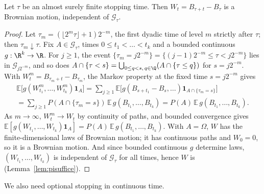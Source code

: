 \begin{theorem}\label{thm:strongmarkov}
Let $\tau$ be an almost surely finite stopping time. Then $W_t=B_{\tau+t}-B_\tau$ is a Brownian motion, independent of $\mathcal G_\tau$.
\end{theorem}
\begin{proof}
Let $\tau_m=(\lfloor2^m\tau\rfloor+1)2^{-m}$, the first dyadic time of level $m$ strictly after $\tau$; then $\tau_m\downarrow\tau$. Fix $A\in\mathcal G_\tau$, times
$0\le t_1<\dots<t_k$ and a bounded continuous $g:\R^k\to\R$. For $j\ge1$, the event $\{\tau_m=j2^{-m}\}=\{(j-1)2^{-m}\le\tau<j2^{-m}\}$ lies in
$\mathcal G_{j2^{-m}}$, and so does $A\cap\{\tau<s\}=\bigcup_{0\le q<s,\,q\in\Q}(A\cap\{\tau\le q\})$ for $s=j2^{-m}$. With $W^m_t=B_{\tau_m+t}-B_{\tau_m}$, the Markov
property at the fixed time $s=j2^{-m}$ gives
\[
\begin{gathered}
\mathbb E\bigl[g(W^m_{t_1},\dots,W^m_{t_k})\mathbf 1_A\bigr]=\sum_{j\ge1}\mathbb E\bigl[g(B_{s+t_1}-B_s,\dots)\mathbf 1_{A\cap\{\tau_m=s\}}\bigr]\\
=\sum_{j\ge1}P(A\cap\{\tau_m=s\})\,\mathbb E\,g(B_{t_1},\dots,B_{t_k})=P(A)\,\mathbb E\,g(B_{t_1},\dots,B_{t_k}).
\end{gathered}
\]
As $m\to\infty$, $W^m_t\to W_t$ by continuity of paths, and bounded convergence gives $\mathbb E[g(W_{t_1},\dots,W_{t_k})\mathbf 1_A]=P(A)\,\mathbb E\,g(B_{t_1},\dots,B_{t_k})$.
With $A=\Omega$, $W$ has the finite-dimensional laws of Brownian motion; it has continuous paths and $W_0=0$, so it is a Brownian motion. And since bounded
continuous $g$ determine laws, $(W_{t_1},\dots,W_{t_k})$ is independent of $\mathcal G_\tau$ for all times, hence $W$ is (Lemma~\ref{lem:pisuffice}).
\end{proof}

We also need optional stopping in continuous time.

